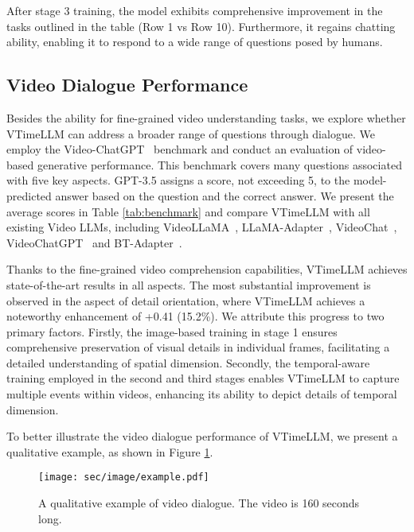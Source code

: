 \documentclass[10pt,twocolumn,letterpaper]{article}
\begin{document}
After stage 3 training, the model exhibits comprehensive improvement in the tasks outlined in the table (Row 1 vs Row 10). Furthermore, it regains chatting ability, enabling it to respond to a wide range of questions posed by humans.






\subsection{Video Dialogue Performance}



Besides the ability for fine-grained video understanding tasks, we explore whether VTimeLLM can address a broader range of questions through dialogue. We employ the Video-ChatGPT~\cite{maaz2023videochatgpt} benchmark and conduct an evaluation of video-based generative performance. This benchmark covers many questions associated with five key aspects. GPT-3.5 assigns a score, not exceeding 5, to the model-predicted answer based on the question and the correct answer. We present the average scores in Table \ref{tab:benchmark} and compare VTimeLLM with all existing Video LLMs, including VideoLLaMA~\cite{zhang2023videollama}, LLaMA-Adapter~\cite{zhang2023llama-adapter}, VideoChat~\cite{li2023videochat}, VideoChatGPT~\cite{maaz2023videochatgpt} and BT-Adapter~\cite{liu2023one_btadapter}.

Thanks to the fine-grained video comprehension capabilities, VTimeLLM achieves state-of-the-art results in all aspects. The most substantial improvement is observed in the aspect of detail orientation, where VTimeLLM achieves a noteworthy enhancement of +0.41 (15.2\%). We attribute this progress to two primary factors. Firstly, the image-based training in stage 1 ensures comprehensive preservation of visual details in individual frames, facilitating a detailed understanding of spatial dimension. Secondly, the temporal-aware training employed in the second and third stages enables VTimeLLM to capture multiple events within videos, enhancing its ability to depict details of temporal dimension.

To better illustrate the video dialogue performance of VTimeLLM, we present a qualitative example, as shown in Figure \ref{fig:example}.

\begin{figure}[htbp]
  \centering
  \texttt{[image: sec/image/example.pdf]}
  \caption{A qualitative example of video dialogue. The video is 160 seconds long.}
  \label{fig:example}
\end{figure}
\end{document}
